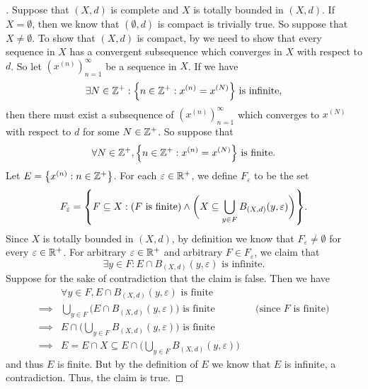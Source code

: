 \begin{proof}[]
  Suppose that \((X, d)\) is complete and \(X\) is totally bounded in \((X, d)\).
  If \(X = \emptyset\), then we know that \((\emptyset, d)\) is compact is trivially true.
  So suppose that \(X \neq \emptyset\).
  To show that \((X, d)\) is compact, by  we need to show that every sequence in \(X\) has a convergent subsequence which converges in \(X\) with respect to \(d\).
  So let \((x^{(n)})_{n = 1}^\infty\) be a sequence in \(X\).
  If we have
  \[
    \exists N \in \Z^+ : \set{n \in \Z^+ : x^{(n)} = x^{(N)}} \text{ is infinite},
  \]
  then there must exist a subsequence of \((x^{(n)})_{n = 1}^\infty\) which converges to \(x^{(N)}\) with respect to \(d\) for some \(N \in \mathbb{Z}^+\).
  So suppose that
  \[
    \forall N \in \Z^+, \set{n \in \Z^+ : x^{(n)} = x^{(N)}} \text{ is finite}.
  \]
  Let \(E = \left\lbrace x^{(n)} : n \in \mathbb{Z}^+\right\rbrace\).
  For each \(\varepsilon \in \mathbb{R}^+\), we define \(F_\varepsilon\) to be the set
  \[
    F_\varepsilon = \set{F \subseteq X : (F \text{ is finite}) \land \bigg(X \subseteq \bigcup_{y \in F} B_{(X, d)}(y, \varepsilon)\bigg)}.
  \]
  Since \(X\) is totally bounded in \((X, d)\), by definition we know that \(F_\varepsilon \neq \emptyset\) for every \(\varepsilon \in \mathbb{R}^+\).
  For arbitrary \(\varepsilon \in \mathbb{R}^+\) and arbitrary \(F \in F_\varepsilon\), we claim that
  \[
    \exists y \in F : E \cap B_{(X, d)}(y, \varepsilon) \text{ is infinite}.
  \]
  Suppose for the sake of contradiction that the claim is false.
  Then we have
  \begin{align*}
             & \forall y \in F, E \cap B_{(X, d)}(y, \varepsilon) \text{ is finite}                                                       \\
    \implies & \bigcup_{y \in F} \bigg(E \cap B_{(X, d)}(y, \varepsilon)\bigg) \text{ is finite}      &  & \text{(since \(F\) is finite)} \\
    \implies & E \cap \bigg(\bigcup_{y \in F} B_{(X, d)}(y, \varepsilon)\bigg) \text{ is finite}                                          \\
    \implies & E = E \cap X \subseteq E \cap \bigg(\bigcup_{y \in F} B_{(X, d)}(y, \varepsilon)\bigg)
  \end{align*}
  and thus \(E\) is finite.
  But by the definition of \(E\) we know that \(E\) is infinite, a contradiction.
  Thus, the claim is true.


\end{proof}
